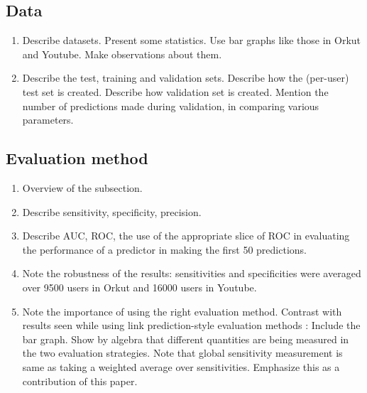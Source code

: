 \documentclass[11pt]{article}
\begin{document}
\subsection{Data}
\begin{enumerate}
 \item Describe datasets.
  \subitem Present some statistics. Use bar graphs like those in Orkut and Youtube. Make observations about them.
 \item Describe the test, training and validation sets.
  \subitem Describe how the (per-user) test set is created.
  \subitem Describe how validation set is created. Mention the number of predictions made during validation, in comparing various parameters.
\end{enumerate}

\subsection{Evaluation method}
\begin{enumerate}
 \item Overview of the subsection.
 \item Describe sensitivity, specificity, precision.
 \item Describe AUC, ROC, the use of the appropriate slice of ROC in evaluating the performance of a predictor in making the first 50 predictions.
 \item Note the robustness of the results: sensitivities and specificities were averaged over 9500 users in Orkut and 16000 users in Youtube.
 \item Note the importance of using the right evaluation method. Contrast with results seen while using link prediction-style evaluation methods : Include the bar graph.
  \subitem Show by algebra that different quantities are being measured in the two evaluation strategies. Note that global sensitivity measurement is same as taking a weighted average over sensitivities.
  \subitem Emphasize this as a contribution of this paper.
\end{enumerate}
\end{document}
